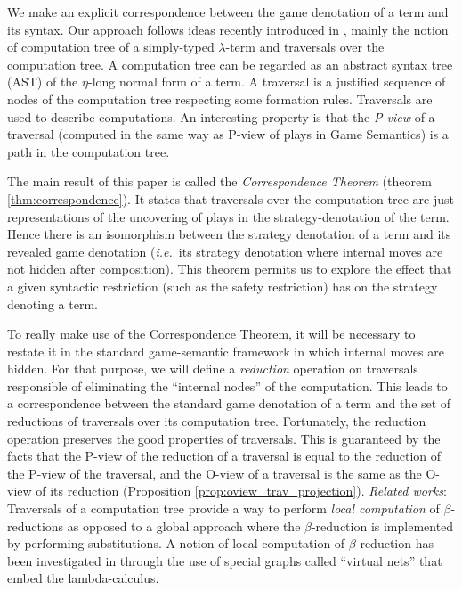 
We make an explicit correspondence between the game denotation of a term and its syntax. Our approach follows ideas recently introduced in \cite{OngLics2006}, mainly the notion of computation tree of a simply-typed $\lambda$-term and traversals over the computation tree. A computation tree can be regarded as an abstract syntax tree (AST) of the $\eta$-long normal form of a term. A traversal is a justified sequence of nodes of the computation tree respecting some formation rules. Traversals are used to describe computations. An interesting property is that the \emph{P-view} of a traversal (computed in the same way as P-view of plays in Game Semantics) is a path in the computation tree.

The main result of this paper is called the \emph{Correspondence Theorem} (theorem \ref{thm:correspondence}). It states that traversals over the computation tree are just representations of the uncovering of plays in the strategy-denotation of the term. Hence there is an isomorphism between the strategy denotation of a term and its revealed game denotation ({\it i.e.}~its strategy denotation where internal moves are not hidden after composition). This theorem permits us to explore the effect that a given syntactic restriction (such as the safety restriction) has on the strategy denoting a term.

To really make use of the Correspondence Theorem, it will be necessary to restate it in the standard game-semantic framework in which internal moves are hidden. For that purpose, we will define a \emph{reduction} operation on traversals responsible of eliminating the ``internal nodes'' of the computation. This leads to a correspondence between the standard game denotation of a term and the set of reductions of traversals over its computation tree. Fortunately, the reduction operation preserves the good properties of traversals. This is guaranteed by the facts that the P-view of
the reduction of a traversal is equal to the reduction of the P-view of the traversal, and the O-view of a traversal is the same as the
O-view of its reduction (Proposition \ref{prop:oview_trav_projection}). \vspace{8pt} \emph{Related works}: Traversals of a computation tree provide a way to perform \emph{local computation} of $\beta$-reductions as opposed to a global approach where the $\beta$-reduction is implemented by
performing substitutions. A notion of local computation of $\beta$-reduction has been investigated in \cite{DanosRegnier-Localandasynchronou} through the use of special graphs called ``virtual nets'' that embed the lambda-calculus.

